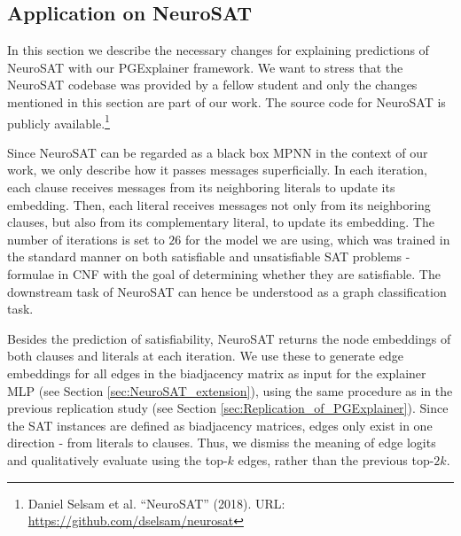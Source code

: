 \subsection{Application on NeuroSAT}
\label{sec:Application_to_NeuroSAT}

In this section we describe the necessary changes for explaining predictions of NeuroSAT \cite{selsam2018learning} with our PGExplainer framework. We want to stress that the NeuroSAT codebase was provided by a fellow student and only the changes mentioned in this section are part of our work. The source code for NeuroSAT is publicly available.\footnote{Daniel Selsam et al. “NeuroSAT” (2018). URL: \url{https://github.com/dselsam/neurosat}} \bigskip

Since NeuroSAT can be regarded as a black box MPNN in the context of our work, we only describe how it passes messages superficially. In each iteration, each clause receives messages from its neighboring literals to update its embedding. Then, each literal receives messages not only from its neighboring clauses, but also from its complementary literal, to update its embedding. The number of iterations is set to $26$ for the model we are using, which was trained in the standard manner on both satisfiable and unsatisfiable SAT problems - formulae in CNF with the goal of determining whether they are satisfiable. The downstream task of NeuroSAT can hence be understood as a graph classification task.

Besides the prediction of satisfiability, NeuroSAT returns the node embeddings of both clauses and literals at each iteration. We use these to generate edge embeddings for all edges in the biadjacency matrix as input for the explainer MLP (see Section \ref{sec:NeuroSAT_extension}), using the same procedure as in the previous replication study (see Section \ref{sec:Replication_of_PGExplainer}). Since the SAT instances are defined as biadjacency matrices, edges only exist in one direction - from literals to clauses. Thus, we dismiss the meaning of edge logits and qualitatively evaluate using the top-$k$ edges, rather than the previous top-$2k$. \bigskip

